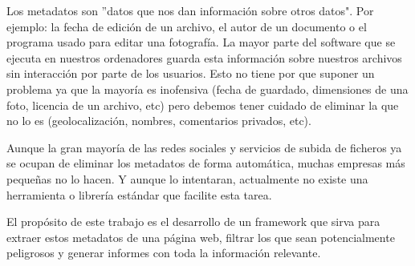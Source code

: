 Los metadatos son ''datos que nos dan información sobre otros datos". Por ejemplo: la fecha de edición de un archivo, el autor de un documento o el programa usado para editar una fotografía. La mayor parte del software que se ejecuta en nuestros ordenadores guarda esta información sobre nuestros archivos sin interacción por parte de los usuarios. Esto no tiene por que suponer un problema ya que la mayoría es inofensiva (fecha de guardado, dimensiones de una foto, licencia de un archivo, etc) pero debemos tener cuidado de eliminar la que no lo es (geolocalización, nombres, comentarios privados, etc).

Aunque la gran mayoría de las redes sociales y servicios de subida de ficheros ya se ocupan de eliminar los metadatos de forma automática, muchas empresas más pequeñas no lo hacen. Y aunque lo intentaran, actualmente no existe una herramienta o librería estándar que facilite esta tarea.

El propósito de este trabajo es el desarrollo de un framework que sirva para extraer estos metadatos de una página web, filtrar los que sean potencialmente peligrosos y generar informes con toda la información relevante. 

